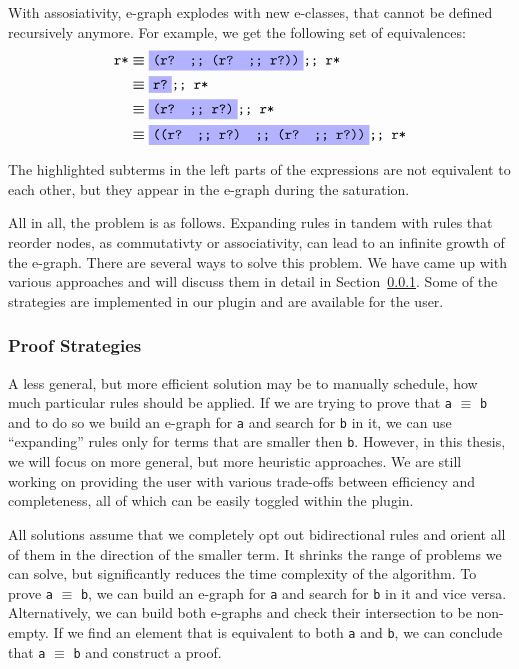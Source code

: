 With assosiativity, e-graph explodes with new e-classes, that cannot be defined recursively anymore. For example, we get the following set of equivalences: 
\begin{align*}
    \texttt{r*} &\boldsymbol{\equiv} \highlight{blue!30}{\texttt{(r? ;; (r? ;; r?))}} \texttt{;; r*} \\ 
       &\boldsymbol{\equiv} \highlight{blue!30}{\texttt{r?}} \texttt{;; r*} \\ 
       &\boldsymbol{\equiv} \highlight{blue!30}{\texttt{(r? ;; r?)}} \texttt{;; r*} \\ 
       &\boldsymbol{\equiv} \highlight{blue!30}{\texttt{((r? ;; r?) ;; (r? ;; r?))}} \texttt{;; r*} \\ 
\end{align*}

The highlighted subterms in the left parts of the expressions are not equivalent to each other, but they appear in the e-graph during the saturation. 

All in all, the problem is as follows. Expanding rules in tandem with rules that reorder nodes, as commutativty or associativity, can lead to an infinite growth of the e-graph. There are several ways to solve this problem. We have came up with various approaches and will discuss them in detail in Section~\ref{sec:proof_strategies}. Some of the strategies are implemented in our plugin and are available for the user.

\subsubsection{Proof Strategies}\label{sec:proof_strategies}
A less general, but more efficient solution may be to manually schedule, how much particular rules should be applied. If we are trying to prove that \texttt{a} $\boldsymbol{\equiv}$ \texttt{b} and to do so we build an e-graph for \texttt{a} and search for \texttt{b} in it, we can use ``expanding'' rules only for terms that are smaller then \texttt{b}. However, in this thesis, we will focus on more general, but more heuristic approaches. We are still working on providing the user with various trade-offs between efficiency and completeness, all of which can be easily toggled within the plugin. 

All solutions assume that we completely opt out bidirectional rules and orient all of them in the direction of the smaller term. It shrinks the range of problems we can solve, but significantly reduces the time complexity of the algorithm. To prove \texttt{a} $\boldsymbol{\equiv}$ \texttt{b}, we can build an e-graph for \texttt{a} and search for \texttt{b} in it and vice versa. Alternatively, we can build both e-graphs and check their intersection to be non-empty. If we find an element that is equivalent to both \texttt{a} and \texttt{b}, we can conclude that \texttt{a} $\boldsymbol{\equiv}$ \texttt{b} and construct a proof.

